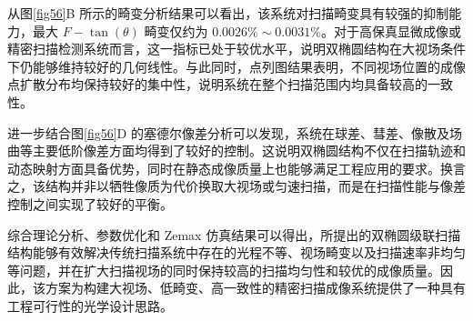 从图\ref{fig56}B 所示的畸变分析结果可以看出，该系统对扫描畸变具有较强的抑制能力，最大 $F-\tan(\theta)$ 畸变仅约为 $0.0026\%\sim0.0031\%$。对于高保真显微成像或精密扫描检测系统而言，这一指标已处于较优水平，说明双椭圆结构在大视场条件下仍能够维持较好的几何线性。与此同时，点列图结果表明，不同视场位置的成像点扩散分布均保持较好的集中性，说明系统在整个扫描范围内均具备较高的一致性。

进一步结合图\ref{fig56}D 的塞德尔像差分析可以发现，系统在球差、彗差、像散及场曲等主要低阶像差方面均得到了较好的控制。这说明双椭圆结构不仅在扫描轨迹和动态映射方面具备优势，同时在静态成像质量上也能够满足工程应用的要求。换言之，该结构并非以牺牲像质为代价换取大视场或匀速扫描，而是在扫描性能与像差控制之间实现了较好的平衡。

综合理论分析、参数优化和 Zemax 仿真结果可以得出，所提出的双椭圆级联扫描结构能够有效解决传统扫描系统中存在的光程不等、视场畸变以及扫描速率非均匀等问题，并在扩大扫描视场的同时保持较高的扫描均匀性和较优的成像质量。因此，该方案为构建大视场、低畸变、高一致性的精密扫描成像系统提供了一种具有工程可行性的光学设计思路。